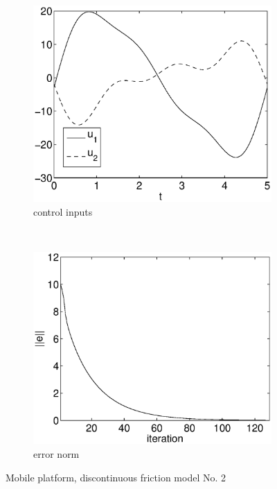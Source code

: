 \begin{figure}[h]
\begin{subfigure}[b]{0.45\textwidth}
\centering
\includegraphics[width=\textwidth]{img/discont_ok_u.eps}
\caption{control inputs}
\end{subfigure}
~
\begin{subfigure}[b]{0.45\textwidth}
\centering
\includegraphics[width=\textwidth]{img/discont_ok_err.eps}
\caption{error norm}
\end{subfigure}
\caption{Mobile platform, discontinuous friction model No. 2}
\label{fig:pr_discont_ok}
\end{figure}